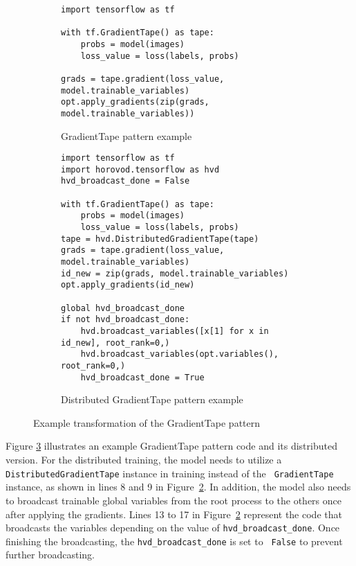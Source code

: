 \begin{figure}[ht!]
  \centering
  \begin{subfigure}[t]{0.8\textwidth}
    \begin{lstlisting}[style=mpython]
import tensorflow as tf

with tf.GradientTape() as tape:
    probs = model(images)
    loss_value = loss(labels, probs)

grads = tape.gradient(loss_value, model.trainable_variables)
opt.apply_gradients(zip(grads, model.trainable_variables))\end{lstlisting}
    \caption{GradientTape pattern example}
    \label{fig:trans:gtapetrans:a}
  \end{subfigure}
  \hspace{5mm}
  \begin{subfigure}[t]{0.8\textwidth}
    \begin{lstlisting}[style=mpython]
import tensorflow as tf
import horovod.tensorflow as hvd
hvd_broadcast_done = False

with tf.GradientTape() as tape:
    probs = model(images)
    loss_value = loss(labels, probs)
tape = hvd.DistributedGradientTape(tape)
grads = tape.gradient(loss_value, model.trainable_variables)
id_new = zip(grads, model.trainable_variables)
opt.apply_gradients(id_new)

global hvd_broadcast_done
if not hvd_broadcast_done:
    hvd.broadcast_variables([x[1] for x in id_new], root_rank=0,)
    hvd.broadcast_variables(opt.variables(), root_rank=0,)
    hvd_broadcast_done = True\end{lstlisting}
    \caption{Distributed GradientTape pattern example}
    \label{fig:trans:gtapetrans:b}
  \end{subfigure}
  \caption{Example transformation of the GradientTape pattern}
  \label{fig:trans:gtapetrans}
\end{figure}

\noindent
Figure \ref{fig:trans:gtapetrans} illustrates an example GradientTape pattern
code and its distributed version.  
For the distributed training, the model needs to utilize a {\tt
DistributedGradientTape} instance in training instead of the {\tt
GradientTape} instance, as shown in lines 8 and 9 in
Figure~\ref{fig:trans:gtapetrans:b}.
In addition, the model also needs to broadcast trainable global variables from
the root process to the others once after applying the gradients.
Lines 13 to 17 in Figure~\ref{fig:trans:gtapetrans:b} represent the code that
broadcasts the variables depending on the value of {\tt hvd\_broadcast\_done}.
Once finishing the broadcasting, the {\tt hvd\_broadcast\_done} is set to {\tt
False} to prevent further broadcasting.

